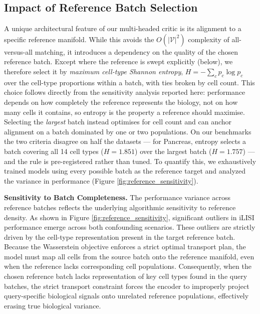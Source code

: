 \documentclass[unnumsec,webpdf,contemporary,large]{oup-authoring-template}%
\theoremstyle{thmstyleone}%
\theoremstyle{thmstyletwo}%
\theoremstyle{thmstylethree}%
\begin{document}
\subsection{Impact of Reference Batch Selection}
A unique architectural feature of our multi-headed critic is its alignment to a specific reference manifold. While this avoids the $O(\lvert\mathcal{V}\rvert^2)$ complexity of all-versus-all matching, it introduces a dependency on the quality of the chosen reference batch. Except where the reference is swept explicitly (below), we therefore select it by \textit{maximum cell-type Shannon entropy}, $H = -\sum_c p_c \log p_c$ over the cell-type proportions within a batch, with ties broken by cell count. This choice follows directly from the sensitivity analysis reported here: performance depends on how completely the reference represents the biology, not on how many cells it contains, so entropy is the property a reference should maximise. Selecting the \textit{largest} batch instead optimises for cell count and can anchor alignment on a batch dominated by one or two populations. On our benchmarks the two criteria disagree on half the datasets --- for Pancreas, entropy selects a batch covering all 14 cell types ($H=1.851$) over the largest batch ($H=1.757$) --- and the rule is pre-registered rather than tuned. To quantify this, we exhaustively trained models using every possible batch as the reference target and analyzed the variance in performance (Figure \ref{fig:reference_sensitivity}).

\textbf{Sensitivity to Batch Completeness.} The performance variance across reference batches reflects the underlying algorithmic sensitivity to reference density. As shown in Figure \ref{fig:reference_sensitivity}, significant outliers in iLISI performance emerge across both confounding scenarios. These outliers are strictly driven by the cell-type representation present in the target reference batch. Because the Wasserstein objective enforces a strict optimal transport plan, the model must map all cells from the source batch onto the reference manifold, even when the reference lacks corresponding cell populations. Consequently, when the chosen reference batch lacks representation of key cell types found in the query batches, the strict transport constraint forces the encoder to improperly project query-specific biological signals onto unrelated reference populations, effectively erasing true biological variance.
\end{document}
